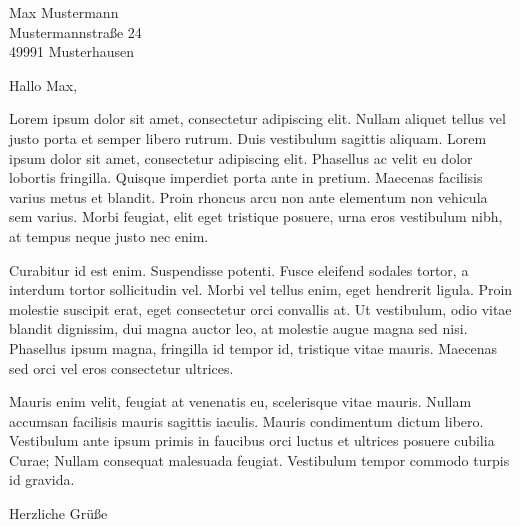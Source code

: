 \documentclass[
	pagenumber=false, %
	parskip=half, %
	foldmarks=true, %
	addrfield=true,
	fromphone=true,
	fromemail=true,
	fromurl=true,
	locfield=wide
	]{scrlttr2}
\begin{document}
 
\begin{letter}{Max Mustermann\\ Mustermannstraße 24 \\ 49991 Musterhausen} %


\opening{Hallo Max,}

Lorem ipsum dolor sit amet, consectetur adipiscing elit. Nullam aliquet tellus vel justo porta et semper libero rutrum. Duis vestibulum sagittis aliquam. Lorem ipsum dolor sit amet, consectetur adipiscing elit. Phasellus ac velit eu dolor lobortis fringilla. Quisque imperdiet porta ante in pretium. Maecenas facilisis varius metus et blandit. Proin rhoncus arcu non ante elementum non vehicula sem varius. Morbi feugiat, elit eget tristique posuere, urna eros vestibulum nibh, at tempus neque justo nec enim.

Curabitur id est enim. Suspendisse potenti. Fusce eleifend sodales tortor, a interdum tortor sollicitudin vel. Morbi vel tellus enim, eget hendrerit ligula. Proin molestie suscipit erat, eget consectetur orci convallis at. Ut vestibulum, odio vitae blandit dignissim, dui magna auctor leo, at molestie augue magna sed nisi. Phasellus ipsum magna, fringilla id tempor id, tristique vitae mauris. Maecenas sed orci vel eros consectetur ultrices.

Mauris enim velit, feugiat at venenatis eu, scelerisque vitae mauris. Nullam accumsan facilisis mauris sagittis iaculis. Mauris condimentum dictum libero. Vestibulum ante ipsum primis in faucibus orci luctus et ultrices posuere cubilia Curae; Nullam consequat malesuada feugiat. Vestibulum tempor commodo turpis id gravida.

\closing{Herzliche Grüße}


\end{letter}
 
\end{document}
